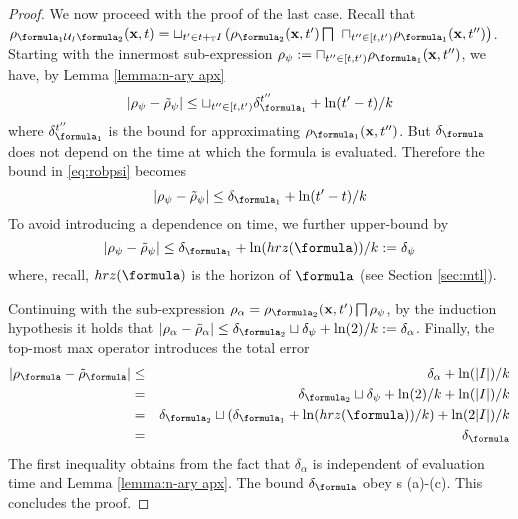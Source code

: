 \begin{proof}
We now proceed with the proof of the last case.
Recall that $\rob_{ \formula_1 \until_I \formula_2} (\sstraj,t) = \sqcup_{t' \in t+_{\TDom}I} \left(\rob_{\formula_2} (\sstraj,t') \bigsqcap \right.
\\
\left. \sqcap_{t'' \in [t,t')}   \rob_{\formula_1} (\sstraj,t'') \right)$.
Starting with the innermost sub-expression $\rob_\psi \defeq \sqcap_{t'' \in [t,t')}   \rob_{\formula_1} (\sstraj,t'')$, we have, by Lemma \ref{lemma:n-ary apx}
\begin{equation}
\label{eq:robpsi}
|\rob_{\psi}-\srob_\psi| \leq \sqcup_{t'' \in [t,t')}\delta_{\formula_1}^{t''} + \ln(t'-t)/k
\end{equation} 
where $\delta_{\formula_1}^{t''} $ is the bound for approximating $\rob_{\formula_1}(\sstraj,t'')$.
But $\delta_\formula$ does not depend on the time at which the formula is evaluated. 
Therefore the bound in \eqref{eq:robpsi} becomes
\begin{equation}
\label{eq:t'-t}
|\rob_{\psi}-\srob_\psi| \leq \delta_{\formula_1} + \ln(t'-t)/k
\end{equation} 
%
To avoid introducing a dependence on time, we further upper-bound by 
\begin{equation*}
|\rob_{\psi}-\srob_\psi| \leq \delta_{\formula_1} + \ln(hrz(\formula))/k \defeq \delta_\psi
\end{equation*} 
where, recall, $hrz(\formula)$ is the horizon of $\formula$ (see Section \ref{sec:mtl}).

Continuing with the sub-expression $\rob_\alpha = \rob_{\formula_2} (\sstraj,t') \bigsqcap \rob_\psi$, by the induction hypothesis it holds that 
$|\rob_\alpha - \srob_\alpha| \leq \delta_{\formula_2} \sqcup \delta_\psi + \ln(2)/k \defeq \delta_\alpha$.
%
Finally, the top-most max operator introduces the total error 
\begin{eqnarray}
\label{eq:deltaphi until}
|\robf-\srobf| &\leq& \delta_\alpha + \ln(|I|)/k 
\nonumber
\\
&=& \delta_{\formula_2} \sqcup \delta_\psi + \ln(2)/k + \ln(|I|)/k 
\nonumber 
\\
&=& \delta_{\formula_2} \sqcup ( \delta_{\formula_1} + \ln(hrz(\formula))/k )+ \ln(2|I|)/k 
\nonumber
\\
&=&\delta_\formula
\end{eqnarray}
The first inequality obtains from the fact that $\delta_\alpha$ is independent of evaluation time and Lemma \ref{lemma:n-ary apx}.
The bound $\delta_\formula$ obey s (a)-(c).
This concludes the proof.
	\end{proof}
	
